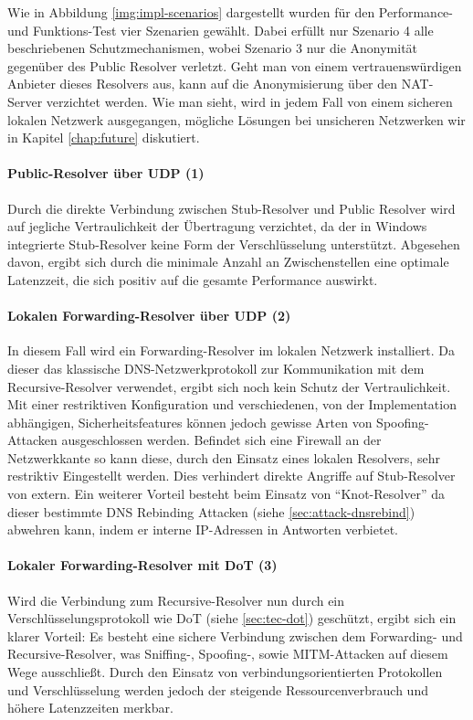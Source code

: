 Wie in Abbildung \ref{img:impl-scenarios} dargestellt wurden für den Performance- und Funktions-Test vier Szenarien gewählt. Dabei erfüllt nur Szenario 4 alle beschriebenen Schutzmechanismen, wobei Szenario 3 nur die Anonymität gegenüber des Public Resolver verletzt. Geht man von einem vertrauenswürdigen Anbieter dieses Resolvers aus, kann auf die Anonymisierung über den NAT-Server verzichtet werden. Wie man sieht, wird in jedem Fall von einem sicheren lokalen Netzwerk ausgegangen, mögliche Lösungen bei unsicheren Netzwerken wir in Kapitel \ref{chap:future} diskutiert. 

\paragraph{Public-Resolver über UDP (1)}
Durch die direkte Verbindung zwischen Stub-Resolver und Public Resolver wird auf jegliche Vertraulichkeit der Übertragung verzichtet, da der in Windows integrierte Stub-Resolver keine Form der Verschlüsselung unterstützt. Abgesehen davon, ergibt sich durch die minimale Anzahl an Zwischenstellen eine optimale Latenzzeit, die sich positiv auf die gesamte Performance auswirkt.

\paragraph{Lokalen Forwarding-Resolver über UDP (2)}
In diesem Fall wird ein Forwarding-Resolver im lokalen Netzwerk installiert. Da dieser das klassische DNS-Netzwerkprotokoll zur Kommunikation mit dem Recursive-Resolver verwendet, ergibt sich noch kein Schutz der Vertraulichkeit. Mit einer restriktiven Konfiguration und verschiedenen, von der Implementation abhängigen, Sicherheitsfeatures können jedoch gewisse Arten von Spoofing-Attacken ausgeschlossen werden. Befindet sich eine Firewall an der Netzwerkkante so kann diese, durch den Einsatz eines lokalen Resolvers, sehr restriktiv Eingestellt werden. Dies verhindert direkte Angriffe auf Stub-Resolver von extern. Ein weiterer Vorteil besteht beim Einsatz von ``Knot-Resolver'' da dieser bestimmte DNS Rebinding Attacken (siehe \ref{sec:attack-dnsrebind}) abwehren kann, indem er interne IP-Adressen in Antworten verbietet\cite{KnotResolverDocRebinding}.

\paragraph{Lokaler Forwarding-Resolver mit DoT (3)}
Wird die Verbindung zum Recursive-Resolver nun durch ein Verschlüsselungsprotokoll wie DoT (siehe \ref{sec:tec-dot}) geschützt, ergibt sich ein klarer Vorteil: Es besteht eine sichere Verbindung zwischen dem Forwarding- und Recursive-Resolver, was Sniffing-, Spoofing-, sowie MITM-Attacken auf diesem Wege ausschließt. Durch den Einsatz von verbindungsorientierten Protokollen und Verschlüsselung werden jedoch der steigende Ressourcenverbrauch und höhere Latenzzeiten merkbar.

